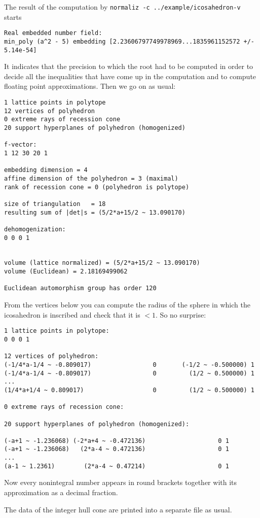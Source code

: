 \documentclass[12pt,a4paper]{scrartcl}
\theoremstyle{definition}
\begin{document}
The result of the computation by \verb|normaliz -c ../example/icosahedron-v| starts
\begin{Verbatim}
Real embedded number field:
min_poly (a^2 - 5) embedding [2.23606797749978969...1835961152572 +/- 5.14e-54]
\end{Verbatim}
It indicates that the precision to which the root had to be computed in order to decide all the inequalities that have come up in the computation and to compute floating point approximations. Then we go on as usual:

\begin{Verbatim}
1 lattice points in polytope
12 vertices of polyhedron
0 extreme rays of recession cone
20 support hyperplanes of polyhedron (homogenized)

f-vector:
1 12 30 20 1 

embedding dimension = 4
affine dimension of the polyhedron = 3 (maximal)
rank of recession cone = 0 (polyhedron is polytope)

size of triangulation   = 18
resulting sum of |det|s = (5/2*a+15/2 ~ 13.090170)

dehomogenization:
0 0 0 1 


volume (lattice normalized) = (5/2*a+15/2 ~ 13.090170)
volume (Euclidean) = 2.18169499062

Euclidean automorphism group has order 120
\end{Verbatim}
From the vertices below you can compute the radius of the sphere in which the icosahedron is inscribed and check that it is $<1$. So no surprise:
\begin{Verbatim}
1 lattice points in polytope:
0 0 0 1

12 vertices of polyhedron:
(-1/4*a-1/4 ~ -0.809017)                 0       (-1/2 ~ -0.500000) 1
(-1/4*a-1/4 ~ -0.809017)                 0         (1/2 ~ 0.500000) 1
...
(1/4*a+1/4 ~ 0.809017)                   0         (1/2 ~ 0.500000) 1

0 extreme rays of recession cone:

20 support hyperplanes of polyhedron (homogenized):

(-a+1 ~ -1.236068) (-2*a+4 ~ -0.472136)                    0 1
(-a+1 ~ -1.236068)   (2*a-4 ~ 0.472136)                    0 1
...
(a-1 ~ 1.2361)        (2*a-4 ~ 0.47214)                    0 1
\end{Verbatim}
Now every nonintegral number appears in round brackets together with its approximation as a decimal fraction.

The data of the integer hull cone are printed into a separate file as usual.
\end{document}
